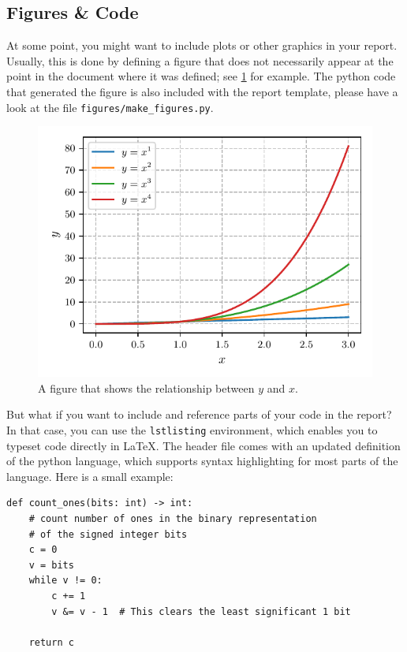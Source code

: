 \documentclass[11pt]{article}
\begin{document}
\subsection{Figures \& Code}
At some point, you might want to include plots or other graphics in your report. Usually, this is done by defining a figure that does not necessarily appear at the point in the document where it was defined; see \cref{fig:functions} for example. The python code that generated the figure is also included with the report template, please have a look at the file \verb|figures/make_figures.py|.

\begin{figure}[t]
    \begin{center}
        \includegraphics{figures/example_plot}
    \end{center}
    \caption{A figure that shows the relationship between $y$ and $x$.}
    \label{fig:functions}
\end{figure}

But what if you want to include and reference parts of your code in the report? In that case, you can use the \verb|lstlisting| environment, which enables you to typeset code directly in \LaTeX. The header file comes with an updated definition of the python language, which supports syntax highlighting for most parts of the language. Here is a small example:
\begin{lstlisting}[language=iPython]
def count_ones(bits: int) -> int:
    # count number of ones in the binary representation 
    # of the signed integer bits   
    c = 0
    v = bits
    while v != 0:
        c += 1
        v &= v - 1  # This clears the least significant 1 bit
        
    return c
\end{lstlisting}
\end{document}

